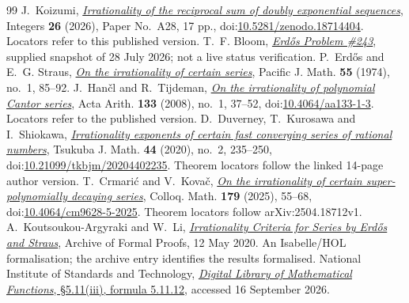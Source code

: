 \documentclass[11pt]{article}
\begin{document}
\begin{thebibliography}{99}
 J.~Koizumi,
  \href{https://math.colgate.edu/~integers/aa28/aa28.pdf}
  {\emph{Irrationality of the reciprocal sum of doubly exponential sequences}},
  Integers \textbf{26} (2026), Paper No.~A28, 17 pp.,
  doi:\href{https://doi.org/10.5281/zenodo.18714404}{10.5281/zenodo.18714404}.
  Locators refer to this published version.
 T.~F. Bloom,
  \href{https://www.erdosproblems.com/243}{\emph{Erd\H{o}s Problem \#243}},
  supplied snapshot of 28 July 2026; not a live status verification.
 P.~Erd\H{o}s and E.~G. Straus,
  \href{https://msp.org/pjm/1974/55-1/pjm-v55-n1-p08-s.pdf}
  {\emph{On the irrationality of certain series}}, Pacific J. Math.
  \textbf{55} (1974), no.~1, 85--92.
 J.~Han\v{c}l and R.~Tijdeman,
  \href{https://www.impan.pl/shop/en/publication/transaction/download/product/82186}
  {\emph{On the irrationality of polynomial Cantor series}},
  Acta Arith. \textbf{133} (2008), no.~1, 37--52,
  doi:\href{https://doi.org/10.4064/aa133-1-3}{10.4064/aa133-1-3}.
  Locators refer to the published version.
 D.~Duverney, T.~Kurosawa and I.~Shiokawa,
  \href{https://danielduverney.fr/documents/theorie-des-nombres/Tsukuba.pdf}
  {\emph{Irrationality exponents of certain fast converging series of rational
  numbers}}, Tsukuba J. Math. \textbf{44} (2020), no.~2, 235--250,
  doi:\href{https://doi.org/10.21099/tkbjm/20204402235}{10.21099/tkbjm/20204402235}.
  Theorem locators follow the linked 14-page author version.
 T.~Crmari\'{c} and V.~Kova\v{c},
  \href{https://arxiv.org/abs/2504.18712v1}
  {\emph{On the irrationality of certain super-polynomially decaying series}},
  Colloq. Math. \textbf{179} (2025), 55--68,
  doi:\href{https://doi.org/10.4064/cm9628-5-2025}{10.4064/cm9628-5-2025}.
  Theorem locators follow arXiv:2504.18712v1.
 A.~Koutsoukou-Argyraki and W.~Li,
  \href{https://isa-afp.org/entries/Irrational_Series_Erdos_Straus.html}
  {\emph{Irrationality Criteria for Series by Erd\H{o}s and Straus}},
  Archive of Formal Proofs, 12 May 2020. An Isabelle/HOL formalisation;
  the archive entry identifies the results formalised.
 National Institute of Standards and Technology,
  \href{https://dlmf.nist.gov/5.11.E12}{\emph{Digital Library of Mathematical
  Functions}, \S5.11(iii), formula 5.11.12}, accessed 16 September 2026.
\end{thebibliography}

\companionpapercontext
\end{document}
